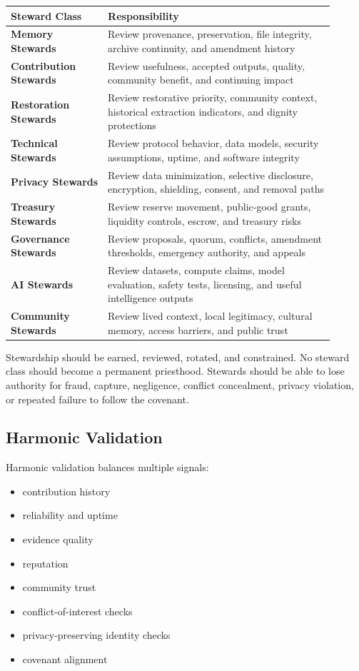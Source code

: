 \documentclass[12pt]{article}
\begin{document}
\begin{longtable}{>{\bfseries}p{0.27\linewidth}p{0.63\linewidth}}
\toprule
Steward Class & Responsibility \\
\midrule
Memory Stewards & Review provenance, preservation, file integrity, archive continuity, and amendment history \\
Contribution Stewards & Review usefulness, accepted outputs, quality, community benefit, and continuing impact \\
Restoration Stewards & Review restorative priority, community context, historical extraction indicators, and dignity protections \\
Technical Stewards & Review protocol behavior, data models, security assumptions, uptime, and software integrity \\
Privacy Stewards & Review data minimization, selective disclosure, encryption, shielding, consent, and removal paths \\
Treasury Stewards & Review reserve movement, public-good grants, liquidity controls, escrow, and treasury risks \\
Governance Stewards & Review proposals, quorum, conflicts, amendment thresholds, emergency authority, and appeals \\
AI Stewards & Review datasets, compute claims, model evaluation, safety tests, licensing, and useful intelligence outputs \\
Community Stewards & Review lived context, local legitimacy, cultural memory, access barriers, and public trust \\
\bottomrule
\end{longtable}

Stewardship should be earned, reviewed, rotated, and constrained. No steward class should become a permanent priesthood. Stewards should be able to lose authority for fraud, capture, negligence, conflict concealment, privacy violation, or repeated failure to follow the covenant.

\subsection{Harmonic Validation}

Harmonic validation balances multiple signals:

\begin{itemize}
  \item contribution history
  \item reliability and uptime
  \item evidence quality
  \item reputation
  \item community trust
  \item conflict-of-interest checks
  \item privacy-preserving identity checks
  \item covenant alignment
\end{itemize}
\end{document}
